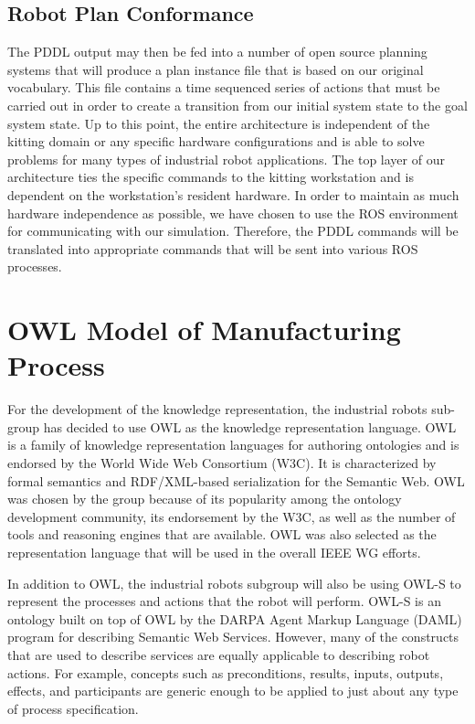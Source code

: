 \documentclass[a4paper, 10pt, conference]{ieeeconf}      %
\begin{document}
\subsection{Robot Plan Conformance}
The PDDL output may then be fed into a number of open source planning systems that will produce a plan instance file that is based on our original vocabulary. This file
contains a time sequenced series of actions that must be carried out in order to create a transition from our initial system state to the goal system state. Up to this point,
the entire architecture is independent of the kitting domain or any specific hardware configurations and is able to solve problems for many types of industrial robot applications.
The top layer of our architecture ties the specific commands to the kitting workstation and is dependent on the workstation's resident hardware.  In order to maintain as
much hardware independence as possible, we have chosen to use the ROS environment for communicating with our simulation. Therefore, the PDDL commands will
be translated into appropriate commands that will be sent into various ROS processes.

\section{OWL Model of Manufacturing Process}
\label{sect:OWL_Layer}
For the development of the  knowledge representation, the industrial robots sub-group has decided to use OWL \cite{OWL} as the knowledge representation language. OWL is a family of knowledge representation languages for authoring ontologies and is endorsed by the World Wide Web Consortium (W3C). It is characterized by formal semantics and RDF/XML-based serialization for the Semantic Web. OWL was chosen by the group because of its popularity among the ontology development community, its endorsement by the W3C, as well as the number of tools and reasoning engines that are available. OWL was also selected as the representation language that will be used in the overall IEEE WG efforts.

In addition to OWL, the industrial robots subgroup will also be using OWL-S \cite{Martin2012} to represent the processes and actions that the robot will perform. OWL-S is an ontology built on top of OWL by the DARPA Agent Markup Language (DAML) program \cite{damlWeb}
for describing Semantic Web Services. However, many of the constructs that are used to describe services are equally applicable to describing robot actions. For example, concepts such as preconditions, results, inputs, outputs, effects, and participants are generic enough to be applied to just about any type of process specification.
\end{document}
